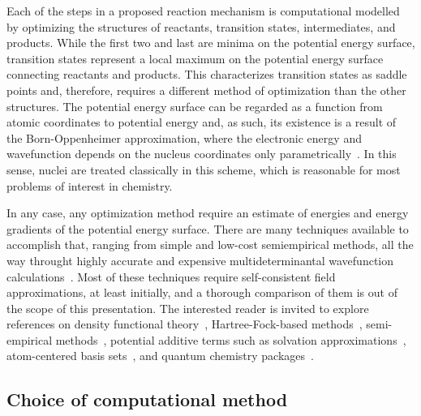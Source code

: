 Each of the steps in a proposed reaction mechanism is computational modelled
by optimizing the structures of reactants,
transition states,
intermediates,
and products.
While the first two and last are minima on the potential energy surface,
transition
states represent a local maximum on the potential energy surface connecting
reactants and products.
This characterizes transition states as saddle points and,
therefore,
requires
a different method of optimization than the other structures.
The potential energy surface can be regarded as a function from atomic coordinates to potential energy and,
as such,
its existence is a result of the Born-Oppenheimer approximation,
where the electronic energy and wavefunction depends on the nucleus coordinates
only parametrically~\cite{Born_1927}.
In this sense,
nuclei are treated classically in this scheme,
which is reasonable for most problems of interest in chemistry.

In any case,
any optimization method require an estimate of energies and energy gradients
of the potential energy surface.
There are many techniques available to accomplish that,
ranging from simple and low-cost semiempirical methods,
all the way throught highly accurate and expensive multideterminantal wavefunction calculations~\cite{Perdew_2001}.
Most of these techniques require self-consistent field approximations,
at least initially,
and a thorough comparison of them is out of the scope of this presentation.
The interested reader is invited to explore
references on density functional theory~\cite{Hohenberg_1964,Kohn_1965,Perdew_1996,Perdew_1997,Ernzerhof_1999,Adamo_1999,Chai_2008a,Chai_2008b,Goerigk_2011,Arago_2011,Salzner_2011,Burns_2011,Minenkov_2012,Perdew_2014,Kryachko_2014,Yu_2016,DFT2016_poll},
Hartree-Fock-based methods~\cite{Szabo_1996},
semi-empirical methods~\cite{MOPAC}, %
potential additive terms such as solvation approximations~\cite{Marenich_2009,Marenich_2012},
atom-centered basis sets~\cite{Ditchfield_1971,Hehre_1972,Hariharan_1973,Hariharan_1974,Gordon_1980,Francl_1982,Clark_1983,Frisch_1984,Binning_1990,Szabo_1996,Helgaker_1997,Blaudeau_1997,Rassolov_1998,Rassolov_2001,Jensen_2012,Hill_2012},
and quantum chemistry packages~\cite{g09}. %

\subsection{Choice of computational method}%
\label{sec:choice-of-method}

